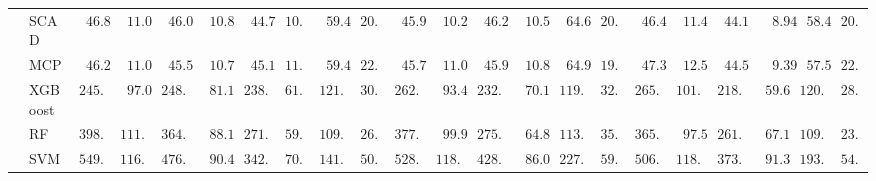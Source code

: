 \begin{tabular}{p{0.2cm}p{1cm}|p{0.6cm}p{0.6cm}|p{0.6cm}p{0.6cm}p{0.6cm}p{0.6cm}p{0.6cm}p{0.6cm}|p{0.6cm}p{0.6cm}p{0.6cm}p{0.6cm}p{0.6cm}p{0.6cm}|p{0.6cm}p{0.6cm}p{0.6cm}p{0.6cm}p{0.6cm}p{0.6cm}}
 & SCAD  & $\phantom{0}46.89$ & $\phantom{0}11.04$ & $\phantom{0}46.03$ & $\phantom{0}10.80$ & $\phantom{0}44.70$ & $10.34$ & $\phantom{0}59.44$ & $20.96$ & $\phantom{0}45.96$ & $\phantom{0}10.28$ & $\phantom{0}46.22$ & $\phantom{0}10.53$ & $\phantom{0}64.60$ & $20.15$ & $\phantom{0}46.47$ & $\phantom{0}11.40$ & $\phantom{0}44.15$ & $\phantom{00}8.94$ & $\phantom{0}58.44$ & $20.66$ \\
 & MCP  & $\phantom{0}46.29$ & $\phantom{0}11.03$ & $\phantom{0}45.51$ & $\phantom{0}10.72$ & $\phantom{0}45.18$ & $11.30$ & $\phantom{0}59.44$ & $22.66$ & $\phantom{0}45.73$ & $\phantom{0}11.00$ & $\phantom{0}45.95$ & $\phantom{0}10.89$ & $\phantom{0}64.93$ & $19.89$ & $\phantom{0}47.33$ & $\phantom{0}12.59$ & $\phantom{0}44.50$ & $\phantom{00}9.39$ & $\phantom{0}57.58$ & $22.39$ \\
 & XGBoost  & $245.25$ & $\phantom{0}97.07$ & $248.21$ & $\phantom{0}81.12$ & $238.05$ & $61.65$ & $121.91$ & $30.26$ & $262.52$ & $\phantom{0}93.47$ & $232.99$ & $\phantom{0}70.12$ & $119.33$ & $32.43$ & $265.31$ & $101.58$ & $218.01$ & $\phantom{0}59.65$ & $120.72$ & $28.45$ \\
 & RF  & $398.68$ & $111.80$ & $364.36$ & $\phantom{0}88.11$ & $271.02$ & $59.26$ & $109.62$ & $26.27$ & $377.42$ & $\phantom{0}99.99$ & $275.74$ & $\phantom{0}64.80$ & $113.58$ & $35.70$ & $365.86$ & $\phantom{0}97.51$ & $261.06$ & $\phantom{0}67.10$ & $109.81$ & $23.97$ \\
 & SVM  & $549.06$ & $116.25$ & $476.33$ & $\phantom{0}90.43$ & $342.46$ & $70.89$ & $141.92$ & $50.27$ & $528.25$ & $118.21$ & $428.04$ & $\phantom{0}86.09$ & $227.35$ & $59.29$ & $506.23$ & $118.23$ & $373.93$ & $\phantom{0}91.39$ & $193.51$ & $54.17$ \\
\hline 
\end{tabular}

